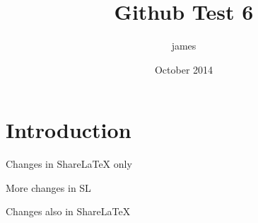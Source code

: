 \documentclass{article}
\title{Github Test 6}
\author{james }
\date{October 2014}
\begin{document}
\maketitle

\section{Introduction}

Changes in ShareLaTeX only

More changes in SL

Changes also in ShareLaTeX
\end{document}
